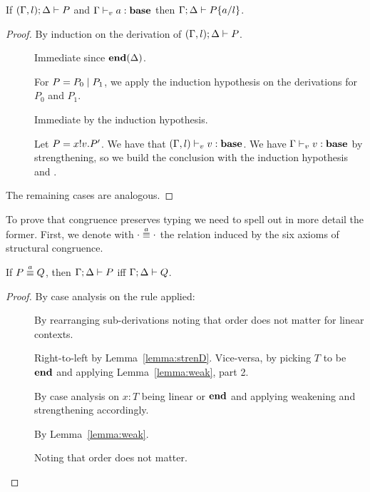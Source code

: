 \begin{lemma}[Substitution]\mbox{}
  \label{le:subst}
  If $(\Gamma, l);\Delta \vdash P$ and
  ${\Gamma \vdash_v a : \mathbf{base}}$ then
  \( \Gamma;\Delta \vdash P\{a/l\} \).
\end{lemma}
\begin{proof}
  By induction on the derivation of $(\Gamma, l);\Delta \vdash P$.
  \begin{description}
  \item[] Immediate since $\mathbf{end}(\Delta)$.

  \item[] For $P = P_0 \mid P_1$, we apply the
    induction hypothesis on the derivations for $P_0$ and $P_1$.

  \item[] Immediate by the induction hypothesis.

  \item[] Let $P = x ! v . P'$. We have that
    $(\Gamma, l) \vdash_v v : \mathbf{base}$.  We have 
    $\Gamma \vdash_v v : \mathbf{base}$ by strengthening, so we build the conclusion with
    the induction hypothesis and .
  \end{description}
  The remaining cases are analogous.
\end{proof}

To prove that congruence preserves typing we need to spell out in more detail the former. First, we denote with $\cdot \stackrel{a}{\equiv} \cdot$ the relation induced by the six axioms of structural congruence.

\begin{lemma}
  \label{le:presequiva}
  If \( P \stackrel{a}{\equiv} Q \), then \( \Gamma;\Delta \vdash P \)  iff \( \Gamma;\Delta \vdash Q \).
\end{lemma}
\begin{proof}
  By case analysis on the  rule applied:
  \begin{description}
  \item[] By rearranging sub-derivations noting that
    order does not matter for linear contexts.
  \item[]
   Right-to-left by Lemma~\ref{lemma:strenD}. Vice-versa,
    by picking $T$ to be $\mathbf{end}$ and applying Lemma~\ref{lemma:weak}, part 2.
  \item[] By case analysis on $x : T$ being linear or $\mathbf{end}$ and applying weakening and strengthening accordingly.
  \item[] By Lemma~\ref{lemma:weak}.
  \item[] Noting that order does not matter.
  \end{description}
\end{proof}

